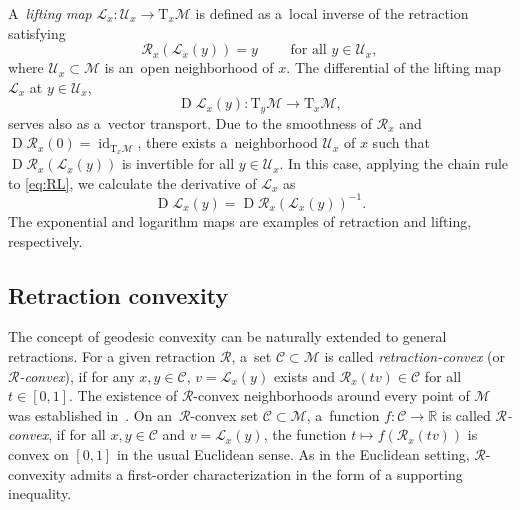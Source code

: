 \documentclass[11pt,reqno]{amsart}
\theoremstyle{plain}
\newcommand\R{\mathbb R}
\DeclareMathOperator{\Drm}{D}
\DeclareMathOperator{\id}{id}
\newcommand\calC{\mathcal C}
\newcommand\calU{\mathcal U}
\newcommand{\M}{\mathcal{M}}
\newcommand{\Tan}{\mathrm{T}}
\newcommand{\Ret}{\mathcal R}
\newcommand{\invRet}{\mathcal L}
\begin{document}
	A~\emph{lifting map} $\invRet_x\colon \calU_x \to \Tan_x\M$ is defined as a~local inverse of the retraction satisfying 
	\begin{equation}\label{eq:RL}
		\Ret_x(\invRet_x(y)) = y\qquad \text{ for all } y\in \calU_x,
	\end{equation}
	where $\calU_x\subset\M$ is an~open neighborhood of $x$. The differential of the lifting map $\invRet_x$ at $y\in \calU_x$,
	\[
	\Drm \invRet_x(y) \colon \Tan_y\M \to \Tan_{x}\M, 
	\]
	serves also as a~vector transport. Due to the smoothness of $\Ret_x$ and $\Drm \Ret_x(0) = \id_{\Tan_x\M}$, there exists a~neighborhood $\calU_x$ of $x$ such that $\Drm \Ret_x(\invRet_x(y))$ is invertible for all $y \in \calU_x$. In this case, applying the chain rule to \eqref{eq:RL}, we calculate the derivative of $\invRet_x$ as
	\begin{equation*} 
		\Drm \invRet_x(y) = \Drm \Ret_x(\invRet_x(y)) ^{-1}.
	\end{equation*}
	The exponential and logarithm maps are examples of retraction and lifting, respectively.
	
	\subsection{Retraction convexity}
	The concept of geodesic convexity \cite[Sect.~6]{Lee18} can be naturally extended to general retractions. 
	For a given retraction $\Ret$, a~set $\calC \subset \M$ is called \emph{retraction-convex} (or \emph{$\Ret$-convex}), if for any $x,y \in \calC$, $v = \invRet_x(y)$ exists and $\Ret_x(tv) \in \calC$ for all $t \in [0,1]$. The existence of $\Ret$-convex neighborhoods
	around every point of $\M$ was established in~\cite[Thm.~3.1]{SegK24}. On an~$\Ret$-convex set $\calC\subset \M$, a~function $f : \calC  \to \R$ is called \emph{$\Ret$-convex}, if for all $x,y \in \calC$ and $v = \invRet_x(y)$, the function $t \mapsto f(\Ret_x(tv))$ is convex on $[0,1]$ in the usual Euclidean sense. As in the Euclidean setting, $\Ret$-convexity admits a first-order characterization in the form of a supporting inequality.
	
\end{document}
